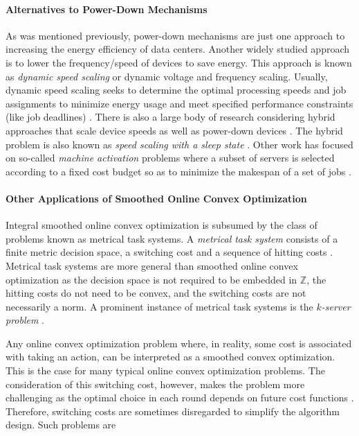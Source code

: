 \paragraph{Alternatives to Power-Down Mechanisms} As was mentioned previously, power-down mechanisms are just one approach to increasing the energy efficiency of data centers. Another widely studied approach is to lower the frequency/speed of devices to save energy. This approach is known as \textit{dynamic speed scaling} or dynamic voltage and frequency scaling. Usually, dynamic speed scaling seeks to determine the optimal processing speeds and job assignments to minimize energy usage and meet specified performance constraints (like job deadlines) \cite{Albers2007, Albers2011, Jin2016}. There is also a large body of research considering hybrid approaches that scale device speeds as well as power-down devices \cite{Jin2016}. The hybrid problem is also known as \textit{speed scaling with a sleep state} \cite{Albers2014}. Other work has focused on so-called \textit{machine activation} problems where a subset of servers is selected according to a fixed cost budget so as to minimize the makespan of a set of jobs \cite{Khuller2009, Li2011}.

\paragraph{Other Applications of Smoothed Online Convex Optimization} Integral smoothed online convex optimization is subsumed by the class of problems known as metrical task systems. A \textit{metrical task system} consists of a finite metric decision space, a switching cost and a sequence of hitting costs \cite{Bubeck2018_3}. Metrical task systems are more general than smoothed online convex optimization as the decision space is not required to be embedded in $\mathbb{Z}$, the hitting costs do not need to be convex, and the switching costs are not necessarily a norm. A prominent instance of metrical task systems is the \textit{$k$-server problem} \cite{Bubeck2017}.

Any online convex optimization problem where, in reality, some cost is associated with taking an action, can be interpreted as a smoothed convex optimization. This is the case for many typical online convex optimization problems. The consideration of this switching cost, however, makes the problem more challenging as the optimal choice in each round depends on future cost functions \cite{Chen2015}. Therefore, switching costs are sometimes disregarded to simplify the algorithm design. Such problems are

